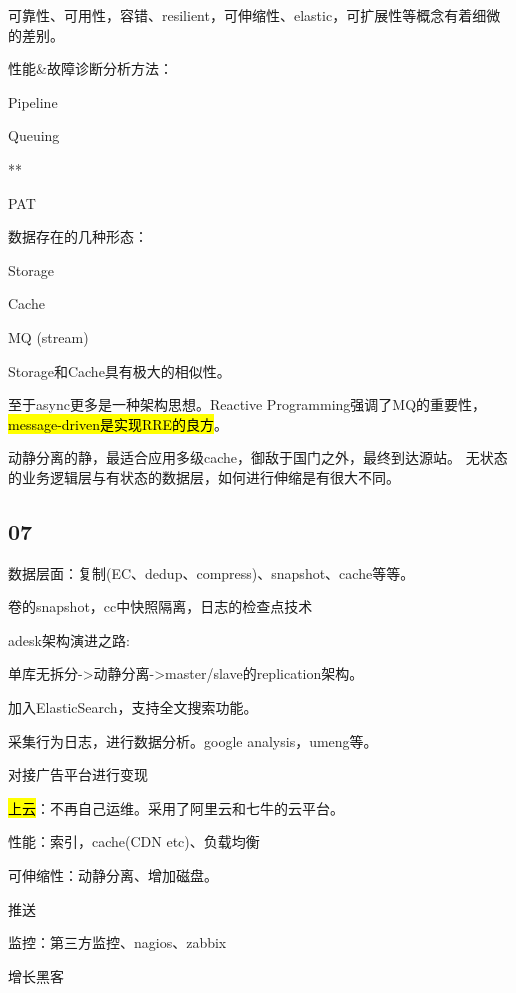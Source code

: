 可靠性、可用性，容错、resilient，可伸缩性、elastic，可扩展性等概念有着细微的差别。

性能\&故障诊断分析方法：
\begin{enumbox}
\item Pipeline
\item Queuing
\item ***
\item PAT
\end{enumbox}

数据存在的几种形态：
\begin{enumbox}
\item Storage
\item Cache
\item MQ (stream)
\end{enumbox}

Storage和Cache具有极大的相似性。

至于async更多是一种架构思想。Reactive Programming强调了MQ的重要性，\hl{message-driven是实现RRE的良方}。

动静分离的静，最适合应用多级cache，御敌于国门之外，最终到达源站。
无状态的业务逻辑层与有状态的数据层，如何进行伸缩是有很大不同。

\subsection{07}

数据层面：复制(EC、dedup、compress)、snapshot、cache等等。

卷的snapshot，cc中快照隔离，日志的检查点技术

\hrulefill

adesk架构演进之路:
\begin{enumbox}
\item 单库无拆分->动静分离->master/slave的replication架构。
\item 加入ElasticSearch，支持全文搜索功能。
\item 采集行为日志，进行数据分析。google analysis，umeng等。
\item 对接广告平台进行变现
\item \hl{上云}：不再自己运维。采用了阿里云和七牛的云平台。
\end{enumbox}

性能：索引，cache(CDN etc)、负载均衡

可伸缩性：动静分离、增加磁盘。

推送

监控：第三方监控、nagios、zabbix

增长黑客

